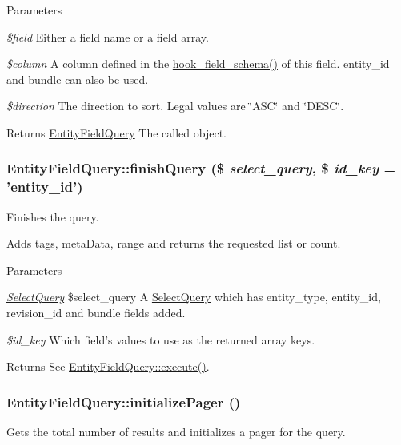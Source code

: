 \begin{DoxyParams}{Parameters}
\item[{\em \$field}]Either a field name or a field array. \item[{\em \$column}]A column defined in the \hyperlink{group__field__types_gaae7d9348e56f207a8be0b866d25252b7}{hook\_\-field\_\-schema()} of this field. entity\_\-id and bundle can also be used. \item[{\em \$direction}]The direction to sort. Legal values are \char`\"{}ASC\char`\"{} and \char`\"{}DESC\char`\"{}.\end{DoxyParams}
\begin{DoxyReturn}{Returns}
\hyperlink{classEntityFieldQuery}{EntityFieldQuery} The called object. 
\end{DoxyReturn}
\hypertarget{classEntityFieldQuery_a764b73a57d7b7186d219d859cbf87ddd}{
\subsubsection[{finishQuery}]{\setlength{\rightskip}{0pt plus 5cm}EntityFieldQuery::finishQuery (\$ {\em select\_\-query}, \/  \$ {\em id\_\-key} = {\ttfamily 'entity\_\-id'})}}
\label{classEntityFieldQuery_a764b73a57d7b7186d219d859cbf87ddd}
Finishes the query.

Adds tags, metaData, range and returns the requested list or count.


\begin{DoxyParams}{Parameters}
\item[{\em \hyperlink{classSelectQuery}{SelectQuery}}]\$select\_\-query A \hyperlink{classSelectQuery}{SelectQuery} which has entity\_\-type, entity\_\-id, revision\_\-id and bundle fields added. \item[{\em \$id\_\-key}]Which field's values to use as the returned array keys.\end{DoxyParams}
\begin{DoxyReturn}{Returns}
See \hyperlink{classEntityFieldQuery_ac90614418d7fb3a0c81134889fe1bcbd}{EntityFieldQuery::execute()}. 
\end{DoxyReturn}
\hypertarget{classEntityFieldQuery_a53c95c5a7f8a4a419aa85fa5d6529524}{
\subsubsection[{initializePager}]{\setlength{\rightskip}{0pt plus 5cm}EntityFieldQuery::initializePager ()}}
\label{classEntityFieldQuery_a53c95c5a7f8a4a419aa85fa5d6529524}
Gets the total number of results and initializes a pager for the query.

